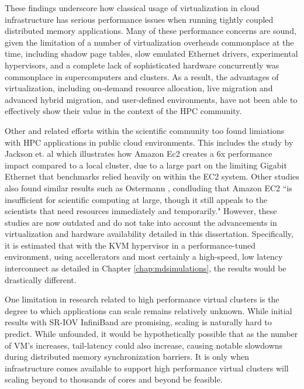 These findings underscore how classical usage of virtualization in cloud infrastructure has serious performance issues when running tightly coupled distributed memory applications. Many of these performance concerns are sound, given the limitation of a number of virtualization overheads commonplace at the time, including shadow page tables, slow emulated Ethernet drivers, experimental hypervisors, and a complete lack of sophisticated hardware concurrently was commonplace in supercomputers and clusters.  As a result, the advantages of virtualization, including on-demand resource allocation, live migration and advanced hybrid migration, and user-defined environments, have not been able to effectively show their value in the context of the HPC community.

Other and related efforts within the scientific community too found limiations with HPC applications in public cloud environments. This includes the study by Jackson et. al \cite{jackson2010performance} which illustrates how Amazon Ec2 creates a 6x performance impact compared to a local cluster, due to a large part on the limiting Gigabit Ethernet that benchmarks relied heavily on within the EC2 system. Other studies also found similar results such as Ostermann \cite{ostermann2009performance}, condluding that Amazon EC2 ``is insufficient for scientific computing at large, though it still appeals to the scientists that need resources immediately and temporarily."  However, these studies are now outdated and do not take into account the advancements in virtualization and hardware availability detailed in this dissertation. Specifically, it is estimated that with the KVM hypervisor in a performance-tuned environment, using accellerators and most certainly a high-speed, low latency interconnect as detailed in Chapter \ref{chap:mdsimulations}, the results would be drastically different. 


One limitation in research related to high performance virtual clusters is the degree to which applications can scale remains relatively unknown. While initial results with SR-IOV InfiniBand are promising, scaling is naturally hard to predict. While unfounded, it would be hypothetically possible that as the number of VM's increases, tail-latency could also increase, causing notable slowdowns during distributed memory synchronization barriers. It is only when infrastructure comes available to support high performance virtual clusters will scaling beyond to thousands of cores and beyond be feasible.  

